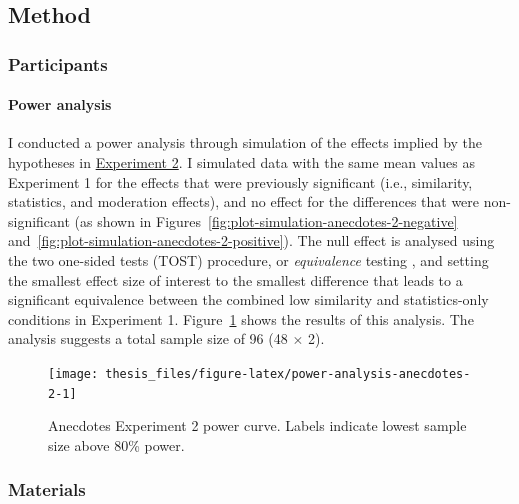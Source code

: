 \documentclass[a4paper, nobind, dvipsnames]{templates/ociamthesis}
\theoremstyle{definition}
\theoremstyle{definition}
\theoremstyle{definition}
\theoremstyle{definition}
\theoremstyle{remark}
\begin{document}
\hypertarget{method-18}{%
\subsection{Method}\label{method-18}}

\hypertarget{participants-18}{%
\subsubsection{Participants}\label{participants-18}}

\hypertarget{power-analysis-anecdotes-2}{%
\paragraph{Power analysis}\label{power-analysis-anecdotes-2}}

I conducted a power analysis through simulation of the effects implied by the
hypotheses in \protect\hyperlink{anecdotes-2}{Experiment 2}. I simulated data with the same mean
values as Experiment 1 for the effects that were previously significant (i.e.,
similarity, statistics, and moderation effects), and no effect for the
differences that were non-significant (as shown in
Figures~\ref{fig:plot-simulation-anecdotes-2-negative}
and~\ref{fig:plot-simulation-anecdotes-2-positive}). The null effect is
analysed using the two one-sided tests (TOST) procedure, or \emph{equivalence}
testing \autocite{lakens2018}, and setting the smallest effect size of interest to the
smallest difference that leads to a significant equivalence between the combined
low similarity and statistics-only conditions in Experiment 1.
Figure~\ref{fig:power-analysis-anecdotes-2} shows the results of this analysis.
The analysis suggests a total sample size of 96
(48 \(\times\) 2).

\newpage

\begin{landscape}



\begin{figure}
\texttt{[image: thesis\_files/figure-latex/power-analysis-anecdotes-2-1]} \caption{Anecdotes Experiment 2 power curve. Labels indicate lowest sample size above 80\% power.}\label{fig:power-analysis-anecdotes-2}
\end{figure}

\end{landscape}

\newpage

\hypertarget{materials-17}{%
\subsubsection{Materials}\label{materials-17}}
\end{document}
